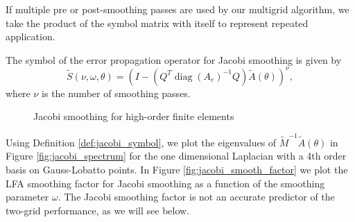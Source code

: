 \documentclass[review]{siamart190516}
\DeclareMathOperator{\diag}{diag}
\begin{document}
If multiple pre or post-smoothing passes are used by our multigrid algorithm, we take the product of the symbol matrix with itself to represent repeated application.

\begin{definition}
The symbol of the error propagation operator for Jacobi smoothing is given by
\begin{equation}
\tilde{S} \left( \nu, \omega, \theta \right) = \left( I - \left( Q^T \diag \left( A_e \right)^{-1} Q \right) \tilde{A} \left( \theta \right) \right)^\nu,
\end{equation}
where $\nu$ is the number of smoothing passes.
\end{definition}\label{def:jacobi_symbol}

\begin{figure}[!tbp]
  \centering
  \hfill
  \caption{Jacobi smoothing for high-order finite elements}
\end{figure}

Using Definition \ref{def:jacobi_symbol}, we plot the eigenvalues of $\tilde{M}^{-1} \tilde{A} \left( \theta \right)$ in Figure \ref{fig:jacobi_spectrum} for the one dimensional Laplacian with a 4th order basis on Gauss-Lobatto points.
In Figure \ref{fig:jacobi_smooth_factor} we plot the LFA smoothing factor for Jacobi smoothing as a function of the smoothing parameter $\omega$.
The Jacobi smoothing factor is not an accurate predictor of the two-grid performance, as we will see below.
\end{document}

